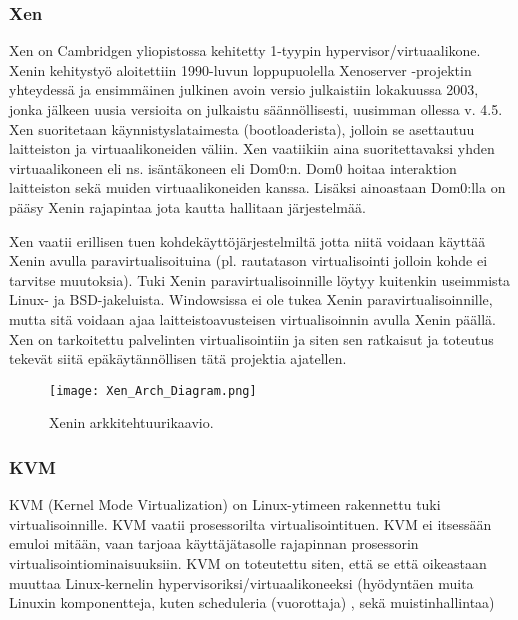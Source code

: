 \subsubsection{Xen}
Xen on Cambridgen yliopistossa kehitetty 1-tyypin hypervisor/virtuaalikone. %
Xenin kehitystyö aloitettiin 1990-luvun loppupuolella Xenoserver -projektin yhteydessä ja ensimmäinen julkinen avoin versio julkaistiin lokakuussa 2003, jonka jälkeen uusia versioita on julkaistu säännöllisesti, uusimman ollessa v. 4.5. Xen suoritetaan käynnistyslataimesta (bootloaderista), jolloin se asettautuu laitteiston ja virtuaalikoneiden väliin. Xen vaatiikiin aina suoritettavaksi yhden virtuaalikoneen eli ns. isäntäkoneen eli Dom0:n. Dom0 hoitaa interaktion laitteiston sekä muiden virtuaalikoneiden kanssa. Lisäksi ainoastaan Dom0:lla on pääsy Xenin rajapintaa jota kautta hallitaan järjestelmää.

Xen vaatii erillisen tuen kohdekäyttöjärjestelmiltä jotta niitä voidaan käyttää Xenin avulla paravirtualisoituina (pl. rautatason virtualisointi jolloin kohde ei tarvitse muutoksia). Tuki Xenin paravirtualisoinnille löytyy kuitenkin useimmista Linux- ja BSD-jakeluista. Windowsissa ei ole tukea Xenin paravirtualisoinnille, mutta sitä voidaan ajaa laitteistoavusteisen virtualisoinnin avulla Xenin päällä. Xen on tarkoitettu palvelinten virtualisointiin ja siten sen ratkaisut ja toteutus tekevät siitä epäkäytännöllisen tätä projektia ajatellen.


\begin{figure}[H]
\centering
\texttt{[image: Xen\_Arch\_Diagram.png]}
\caption{Xenin arkkitehtuurikaavio.}
\end{figure}

\subsubsection{KVM}
KVM (Kernel Mode Virtualization) on Linux-ytimeen rakennettu tuki virtualisoinnille. KVM vaatii prosessorilta virtualisointituen. KVM ei itsessään emuloi mitään, vaan tarjoaa käyttäjätasolle rajapinnan prosessorin virtualisointiominaisuuksiin. KVM on toteutettu siten, että se että oikeastaan muuttaa Linux-kernelin hypervisoriksi/virtuaalikoneeksi  (hyödyntäen muita Linuxin komponentteja, kuten scheduleria (vuorottaja) , sekä muistinhallintaa)

